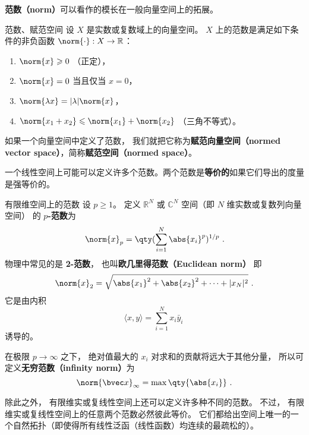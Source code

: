 

\textbf{范数（norm）}可以看作的模长在一般向量空间上的拓展。
\begin{definition}{范数、赋范空间}\label{def_NormV_1}
设 $X$ 是实数或复数域上的向量空间。 $X$ 上的范数是满足如下条件的非负函数 $\norm{\cdot}: X \to \mathbb{R}$：
\begin{enumerate}
\item $\norm{x} \geqslant 0$ （正定），
\item $\norm{x} = 0$ 当且仅当 $x = 0$，
\item $\norm{\lambda x} = |\lambda|\norm{x}$，
\item $\norm{x_1+x_2} \leqslant \norm{x_1} + \norm{x_2}$ （三角不等式）。
\end{enumerate}
如果一个向量空间中定义了范数， 我们就把它称为\textbf{赋范向量空间（normed vector space）}，简称\textbf{赋范空间（normed space）}。
\end{definition}

一个线性空间上可能可以定义许多个范数。两个范数是\textbf{等价的}如果它们导出的度量是强等价的。

\begin{example}{有限维空间上的范数}
设 $p\geq 1$。 定义 $\mathbb R^N$ 或 $\mathbb C^N$ 空间（即 $N$ 维实数或复数列向量空间） 的 \textbf{$p$-范数}为
\begin{equation}
\norm{ x}_p = \qty(\sum_{i=1}^N \abs{x_i}^p)^{1/p}~.
\end{equation}
物理中常见的是 \textbf{2-范数}， 也叫\textbf{欧几里得范数（Euclidean norm）} 即
\begin{equation}
\norm{ x}_2 = \sqrt{\abs{x_1}^2 + \abs{x_2}^2 + \dots+|x_N|^2}~.
\end{equation}
它是由内积
$$
\langle x,y\rangle=\sum_{i=1}^Nx_i\bar y_i~
$$
诱导的。

在极限 $p \to \infty$ 之下， 绝对值最大的 $x_i$ 对求和的贡献将远大于其他分量， 所以可定义\textbf{无穷范数（infinity norm）}为
\begin{equation}
\norm{\bvec x}_\infty = \max \qty{\abs{x_i}}~.
\end{equation}

除此之外， 有限维实或复线性空间上还可以定义许多种不同的范数。 不过， 有限维实或复线性空间上的任意两个范数必然彼此等价。 它们都给出空间上唯一的一个自然拓扑（即使得所有线性泛函（线性函数）均连续的最疏松的）。

\end{example}

